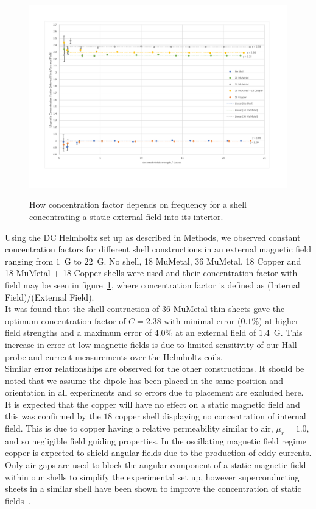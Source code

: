 \documentclass[11pt]{iopart}
\begin{document}
\begin{figure}
  \begin{center}
   \noindent\includegraphics[width=0.75\linewidth]{images/DC-graph.pdf}
  \label{fig:DC_graph}
  \end{center}
  \caption{How concentration factor depends on frequency for a shell concentrating a static external field into its interior.}
\end{figure}

Using the DC Helmholtz set up as described in Methods, we observed
constant concentration factors for different shell constructions in an
external magnetic field ranging from $1$~G to $22$~G. No shell, 18
MuMetal, 36 MuMetal, 18 Copper and 18 MuMetal + 18 Copper shells were
used and their concentration factor with field may be seen in
figure~\ref{fig:DC_graph}, where concentration factor is defined as
(Internal Field)/(External Field). \\ It was found that the shell
contruction of 36 MuMetal thin sheets gave the optimum concentration
factor of $C = 2.38$ with minimal error ($0.1\%$) at higher field
strengths and a maximum error of $4.0\%$ at an external field of
$1.4$~G. This increase in error at low magnetic fields is due to
limited sensitivity of our Hall probe and current measurements over
the Helmholtz coils.\\ Similar error relationships are observed for
the other constructions. It should be noted that we assume the dipole
has been placed in the same position and orientation in all
experiments and so errors due to placement are excluded here.\\ It is
expected that the copper will have no effect on a static magnetic
field and this was confirmed by the $18$ copper shell displaying no
concentration of internal field.  This is due to copper having a
relative permeability similar to air, $\mu_r = 1.0$, and so negligible
field guiding properties. In the oscillating magnetic field regime
copper is expected to shield angular fields due to the production of
eddy currents. Only air-gaps are used to block the angular component
of a static magnetic field within our shells to simplify the
experimental set up, however superconducting sheets in a similar shell
have been shown to improve the concentration of static
fields~\cite{PRATT}.\\
\end{document}
